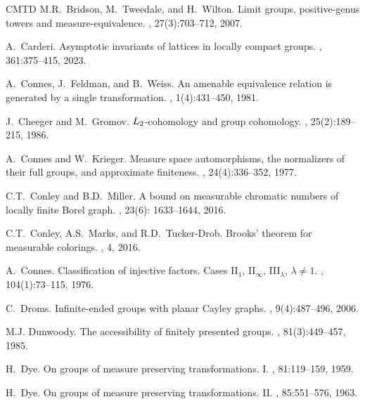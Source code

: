 \documentclass[11pt]{amsart}
\theoremstyle{definition}
\theoremstyle{plain}
\newcommand{\<}{\langle}
\renewcommand{\>}{\rangle}
\begin{document}
\begin{thebibliography}{CMTD}
M.R.~Bridson, M.~Tweedale, and H.~Wilton.
\newblock Limit groups, positive-genus towers and measure-equivalence.
, 27(3):703--712, 2007.

A.~Carderi.
\newblock Asymptotic invariants of lattices in locally compact groups.
, 361:375--415, 2023.

A.~Connes, J.~Feldman, and B.~Weiss.
\newblock An amenable equivalence relation is generated by a single
  transformation.
, 1(4):431--450, 1981.

J.~Cheeger and M.~Gromov.
\newblock ${L}\sb 2$-cohomology and group cohomology.
, 25(2):189--215, 1986.

A.~Connes and W.~Krieger.
\newblock Measure space automorphisms, the normalizers of their full groups,
  and approximate finiteness.
, 24(4):336--352, 1977.

C.T.~Conley and B.D.~Miller.
\newblock A bound on measurable chromatic numbers of locally finite {B}orel
  graph.
, 23(6): 1633--1644, 2016.

C.T.~Conley, A.S.~Marks, and R.D.~Tucker-Drob.
\newblock Brooks' theorem for measurable colorings.
, 4, 2016.

A.~Connes.
\newblock Classification of injective factors. {C}ases {II$_{1}$}, {II$_{\infty
  }$}, {III$_{\lambda }$}, {$\lambda \not=1$}.
, 104(1):73--115, 1976.

C.~Droms.
\newblock Infinite-ended groups with planar {C}ayley graphs.
, 9(4):487--496, 2006.

M.J. Dunwoody.
\newblock The accessibility of finitely presented groups.
, 81(3):449--457, 1985.


H.~Dye.
\newblock On groups of measure preserving transformations. {I}.
, 81:119--159, 1959.

H.~Dye.
\newblock On groups of measure preserving transformations. {I}{I}.
, 85:551--576, 1963.


\end{thebibliography}
\end{document}
